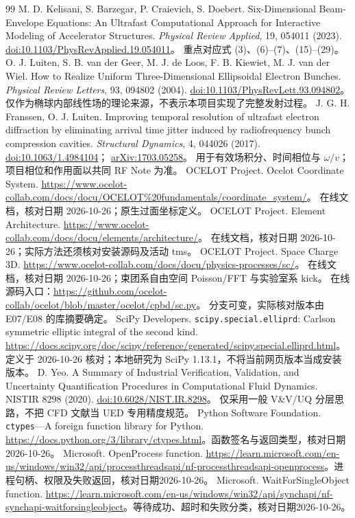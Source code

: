 \begin{thebibliography}{99}
 M. D. Kelisani, S. Barzegar, P. Craievich, S. Doebert.
Six-Dimensional Beam-Envelope Equations: An Ultrafast Computational Approach for Interactive Modeling of Accelerator Structures.
\emph{Physical Review Applied}, 19, 054011 (2023).
\href{https://doi.org/10.1103/PhysRevApplied.19.054011}{doi:10.1103/PhysRevApplied.19.054011}。
重点对应式 (3)、(6)--(7)、(15)--(29)。
 O. J. Luiten, S. B. van der Geer, M. J. de Loos, F. B. Kiewiet, M. J. van der Wiel.
How to Realize Uniform Three-Dimensional Ellipsoidal Electron Bunches.
\emph{Physical Review Letters}, 93, 094802 (2004).
\href{https://doi.org/10.1103/PhysRevLett.93.094802}{doi:10.1103/PhysRevLett.93.094802}。
仅作为椭球内部线性场的理论来源，不表示本项目实现了完整发射过程。
 J. G. H. Franssen, O. J. Luiten.
Improving temporal resolution of ultrafast electron diffraction by eliminating arrival time jitter induced by radiofrequency bunch compression cavities.
\emph{Structural Dynamics}, 4, 044026 (2017).
\href{https://doi.org/10.1063/1.4984104}{doi:10.1063/1.4984104}；
\href{https://arxiv.org/abs/1703.05258}{arXiv:1703.05258}。
用于有效场积分、时间相位与 $\omega/v$；项目相位和作用面以共同 RF Note 为准。
 OCELOT Project. Ocelot Coordinate System.
\url{https://www.ocelot-collab.com/docs/docu/OCELOT%20fundamentals/coordinate_system/}。
在线文档，核对日期 2026-10-26；原生过面坐标定义。
 OCELOT Project. Element Architecture.
\url{https://www.ocelot-collab.com/docs/docu/elements/architecture/}。
在线文档，核对日期 2026-10-26；实际方法还须核对安装源码及活动 tms。
 OCELOT Project. Space Charge 3D.
\url{https://www.ocelot-collab.com/docs/docu/physics-processes/sc/}。
在线文档，核对日期 2026-10-26；束团系自由空间 Poisson/FFT 与实验室系 kick。
在线源码入口：\url{https://github.com/ocelot-collab/ocelot/blob/master/ocelot/cpbd/sc.py}。
分支可变，实际核对版本由 E07/E08 的库摘要确定。
 SciPy Developers. \texttt{scipy.special.elliprd}: Carlson symmetric elliptic integral of the second kind.
\url{https://docs.scipy.org/doc/scipy/reference/generated/scipy.special.elliprd.html}。
定义于 2026-10-26 核对；本地研究为 SciPy 1.13.1，不将当前网页版本当成安装版本。
 D. Yeo. A Summary of Industrial Verification, Validation, and Uncertainty Quantification Procedures in Computational Fluid Dynamics.
NISTIR 8298 (2020).
\href{https://doi.org/10.6028/NIST.IR.8298}{doi:10.6028/NIST.IR.8298}。
仅采用一般 V\&V/UQ 分层思路，不把 CFD 文献当 UED 专用精度规范。
 Python Software Foundation. \texttt{ctypes}---A foreign function library for Python.
\url{https://docs.python.org/3/library/ctypes.html}。函数签名与返回类型，核对日期2026-10-26。
 Microsoft. OpenProcess function.
\url{https://learn.microsoft.com/en-us/windows/win32/api/processthreadsapi/nf-processthreadsapi-openprocess}。进程句柄、权限及失败返回，核对日期2026-10-26。
 Microsoft. WaitForSingleObject function.
\url{https://learn.microsoft.com/en-us/windows/win32/api/synchapi/nf-synchapi-waitforsingleobject}。等待成功、超时和失败分类，核对日期2026-10-26。
\end{thebibliography}
